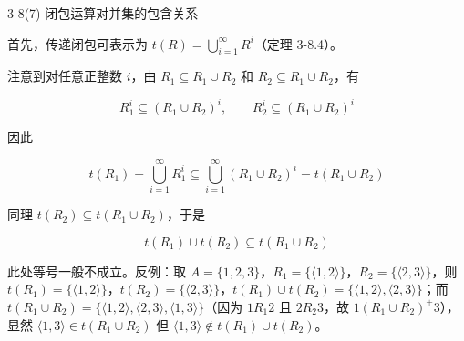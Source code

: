 \documentclass[11pt]{article}
\begin{document}
\begin{question}{3-8(7) 闭包运算对并集的包含关系}
\begin{answer}
    \vspace{1em}

    首先，传递闭包可表示为 $t(R) = \bigcup_{i=1}^{\infty} R^i$（定理 3-8.4）。

    注意到对任意正整数 $i$，由 $R_1 \subseteq R_1 \cup R_2$ 和 $R_2 \subseteq R_1 \cup R_2$，有

    $$R_1^i \subseteq (R_1 \cup R_2)^i, \qquad R_2^i \subseteq (R_1 \cup R_2)^i$$

    因此

    $$t(R_1) = \bigcup_{i=1}^{\infty} R_1^i \subseteq \bigcup_{i=1}^{\infty} (R_1 \cup R_2)^i = t(R_1 \cup R_2)$$

    同理 $t(R_2) \subseteq t(R_1 \cup R_2)$，于是

    $$t(R_1) \cup t(R_2) \subseteq t(R_1 \cup R_2)$$

    \begin{warn}
      此处等号一般不成立。反例：取 $A = \{1,2,3\}$，$R_1 = \{\langle 1,2\rangle\}$，$R_2 = \{\langle 2,3\rangle\}$，则 $t(R_1) = \{\langle 1,2\rangle\}$，$t(R_2) = \{\langle 2,3\rangle\}$，$t(R_1) \cup t(R_2) = \{\langle 1,2\rangle, \langle 2,3\rangle\}$；而 $t(R_1 \cup R_2) = \{\langle 1,2\rangle, \langle 2,3\rangle, \langle 1,3\rangle\}$（因为 $1R_1 2$ 且 $2R_2 3$，故 $1(R_1 \cup R_2)^+ 3$），显然 $\langle 1,3\rangle \in t(R_1 \cup R_2)$ 但 $\langle 1,3\rangle \notin t(R_1) \cup t(R_2)$。
    \end{warn}
  \end{answer}
\end{question}
\end{document}

